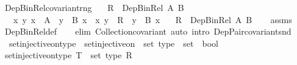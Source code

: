 \begin{isabellebody}
\isanewline
%
\endisadelimproof
\isanewline
{}\isamarkupfalse%
\ Dep{\isacharunderscore}{\kern0pt}Bin{\isacharunderscore}{\kern0pt}Rel{\isacharunderscore}{\kern0pt}covariant{\isacharunderscore}{\kern0pt}rng{\isacharcolon}{\kern0pt}\isanewline
\ \ \ {\isachardoublequoteopen}R\ {\isacharcolon}{\kern0pt}\ Dep{\isacharunderscore}{\kern0pt}Bin{\isacharunderscore}{\kern0pt}Rel\ A\ B{\isachardoublequoteclose}\isanewline
\ \ \ {\isachardoublequoteopen}{\isasymAnd}x\ y{\isachardot}{\kern0pt}\ x\ {\isacharcolon}{\kern0pt}\ A\ {\isasymLongrightarrow}\ y\ {\isacharcolon}{\kern0pt}\ B\ x\ {\isasymLongrightarrow}\ {\isasymlangle}x{\isacharcomma}{\kern0pt}\ y{\isasymrangle}\ {\isasymin}\ R\ {\isasymLongrightarrow}\ y\ {\isacharcolon}{\kern0pt}\ B{\isacharprime}{\kern0pt}\ x{\isachardoublequoteclose}\isanewline
\ \ \ {\isachardoublequoteopen}R\ {\isacharcolon}{\kern0pt}\ Dep{\isacharunderscore}{\kern0pt}Bin{\isacharunderscore}{\kern0pt}Rel\ A\ B{\isacharprime}{\kern0pt}{\isachardoublequoteclose}\isanewline
%
\isadelimproof
\ \ %
\endisadelimproof
%
\isatagproof
{}\isamarkupfalse%
\ assms\ \isamarkupfalse%
\ Dep{\isacharunderscore}{\kern0pt}Bin{\isacharunderscore}{\kern0pt}Rel{\isacharunderscore}{\kern0pt}def\isanewline
\ \ \isamarkupfalse%
\ {\isacharparenleft}{\kern0pt}elim\ Collection{\isacharunderscore}{\kern0pt}covariant{\isacharparenright}{\kern0pt}\ {\isacharparenleft}{\kern0pt}auto\ intro{\isacharcolon}{\kern0pt}\ Dep{\isacharunderscore}{\kern0pt}Pair{\isacharunderscore}{\kern0pt}covariant{\isacharunderscore}{\kern0pt}snd{\isacharparenright}{\kern0pt}%
\endisatagproof
{\isafoldproof}%
%
\isadelimproof
%
\endisadelimproof
%
\isadelimdocument
%
\endisadelimdocument
%
\isatagdocument
%
\isamarkuptrue%
%
\endisatagdocument
{\isafolddocument}%
%
\isadelimdocument
%
\endisadelimdocument
{}\isamarkupfalse%
\isanewline
\ \ set{\isacharunderscore}{\kern0pt}injective{\isacharunderscore}{\kern0pt}on{\isacharunderscore}{\kern0pt}type\ {\isasymequiv}\ {\isachardoublequoteopen}set{\isacharunderscore}{\kern0pt}injective{\isacharunderscore}{\kern0pt}on\ {\isacharcolon}{\kern0pt}{\isacharcolon}{\kern0pt}\ set\ type\ {\isasymRightarrow}\ set\ {\isasymRightarrow}\ bool{\isachardoublequoteclose}\isanewline
{}\isanewline
\ \ \isamarkupfalse%
\ {\isachardoublequoteopen}set{\isacharunderscore}{\kern0pt}injective{\isacharunderscore}{\kern0pt}on{\isacharunderscore}{\kern0pt}type\ {\isacharparenleft}{\kern0pt}T\ {\isacharcolon}{\kern0pt}{\isacharcolon}{\kern0pt}\ set\ type{\isacharparenright}{\kern0pt}\ R\ {\isasymequiv}\isanewline

\end{isabellebody}
